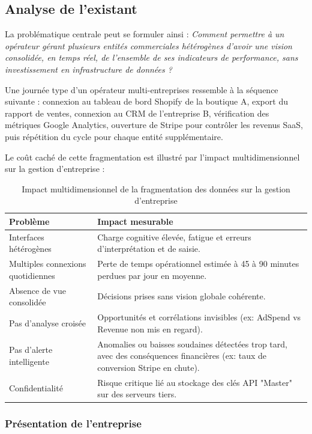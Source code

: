 ﻿\documentclass[12pt,a4paper,oneside]{report} %
\begin{document}
\subsection{Analyse de l'existant}

La problématique centrale peut se formuler ainsi : \textit{Comment permettre à un opérateur gérant plusieurs entités commerciales hétérogènes d'avoir une vision consolidée, en temps réel, de l'ensemble de ses indicateurs de performance, sans investissement en infrastructure de données ?}

Une journée type d'un opérateur multi-entreprises ressemble à la séquence suivante : connexion au tableau de bord Shopify de la boutique A, export du rapport de ventes, connexion au CRM de l'entreprise B, vérification des métriques Google Analytics, ouverture de Stripe pour contrôler les revenus SaaS, puis répétition du cycle pour chaque entité supplémentaire.

Le coût caché de cette fragmentation est illustré par l'impact multidimensionnel sur la gestion d'entreprise :

\begin{table}[H]
\centering
\begin{tabularx}{\textwidth}{|l|X|}
\hline
\textbf{Problème} & \textbf{Impact mesurable} \\ \hline
Interfaces hétérogènes & Charge cognitive élevée, fatigue et erreurs d'interprétation et de saisie. \\ \hline
Multiples connexions quotidiennes & Perte de temps opérationnel estimée à 45 à 90 minutes perdues par jour en moyenne. \\ \hline
Absence de vue consolidée & Décisions prises sans vision globale cohérente. \\ \hline
Pas d'analyse croisée & Opportunités et corrélations invisibles (ex: AdSpend vs Revenue non mis en regard). \\ \hline
Pas d'alerte intelligente & Anomalies ou baisses soudaines détectées trop tard, avec des conséquences financières (ex: taux de conversion Stripe en chute). \\ \hline
Confidentialité & Risque critique lié au stockage des clés API "Master" sur des serveurs tiers. \\ \hline
\end{tabularx}
\caption{Impact multidimensionnel de la fragmentation des données sur la gestion d'entreprise}
\end{table}

\subsubsection{Présentation de l'entreprise}
\end{document}
